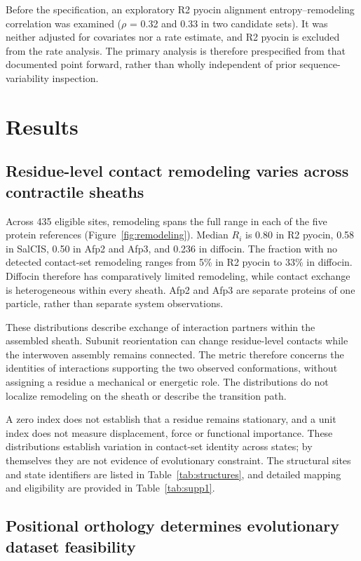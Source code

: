 \documentclass[11pt,a4paper]{article}
\begin{document}
Before the specification, an exploratory R2 pyocin alignment entropy--remodeling correlation was examined (\ensuremath{\rho} = 0.32 and 0.33 in two candidate sets). It was neither adjusted for covariates nor a rate estimate, and R2 pyocin is excluded from the rate analysis. The primary analysis is therefore prespecified from that documented point forward, rather than wholly independent of prior sequence-variability inspection.

\section{Results}

\subsection{Residue-level contact remodeling varies across contractile sheaths}

Across 435 eligible sites, remodeling spans the full range in each of the five protein references (Figure~\ref{fig:remodeling}). Median \(R_i\) is 0.80 in R2 pyocin, 0.58 in SalCIS, 0.50 in Afp2 and Afp3, and 0.236 in diffocin. The fraction with no detected contact-set remodeling ranges from 5\% in R2 pyocin to 33\% in diffocin. Diffocin therefore has comparatively limited remodeling, while contact exchange is heterogeneous within every sheath. Afp2 and Afp3 are separate proteins of one particle, rather than separate system observations.

These distributions describe exchange of interaction partners within the assembled sheath. Subunit reorientation can change residue-level contacts while the interwoven assembly remains connected. The metric therefore concerns the identities of interactions supporting the two observed conformations, without assigning a residue a mechanical or energetic role. The distributions do not localize remodeling on the sheath or describe the transition path.

A zero index does not establish that a residue remains stationary, and a unit index does not measure displacement, force or functional importance. These distributions establish variation in contact-set identity across states; by themselves they are not evidence of evolutionary constraint. The structural sites and state identifiers are listed in Table~\ref{tab:structures}, and detailed mapping and eligibility are provided in Table~\ref{tab:supp1}.

\subsection{Positional orthology determines evolutionary dataset feasibility}
\end{document}
